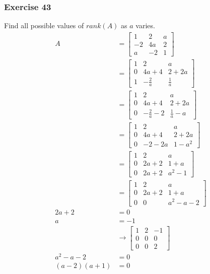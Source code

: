 \documentclass{math}
\begin{document}
\subsubsection*{Exercise 43}
Find all possible values of \( rank(A) \) as \( a \) varies.
\begin{align*}
  A &= \begin{bmatrix}
    1 & 2 & a \\
    -2 & 4a & 2 \\
    a & -2 & 1
  \end{bmatrix} \\
  &= \begin{bmatrix}
    1 & 2 & a \\
    0 & 4a+4 & 2+2a \\
    1 & -\frac{2}{a} & \frac{1}{a}
  \end{bmatrix} \\
  &= \begin{bmatrix}
    1 & 2 & a \\
    0 & 4a+4 & 2+2a \\
    0 & -\frac{2}{a}-2 & \frac{1}{a}-a
  \end{bmatrix} \\
  &= \begin{bmatrix}
    1 & 2 & a \\
    0 & 4a+4 & 2+2a \\
    0 & -2-2a & 1-a^2
  \end{bmatrix} \\
  &= \begin{bmatrix}
    1 & 2 & a \\
    0 & 2a+2 & 1+a \\
    0 & 2a+2 & a^2-1
  \end{bmatrix} \\
  &= \begin{bmatrix}
    1 & 2 & a \\
    0 & 2a+2 & 1+a \\
    0 & 0 & a^2-a-2
  \end{bmatrix} \\
  2a+2 &= 0 \\
  a &= -1 \\
  &\to \begin{bmatrix}
    1 & 2 & -1 \\
    0 & 0 & 0 \\
    0 & 0 & 2
  \end{bmatrix} \\
  a^2-a-2 &= 0 \\
  (a-2)(a+1) &= 0 \\

\end{align*}
\end{document}
